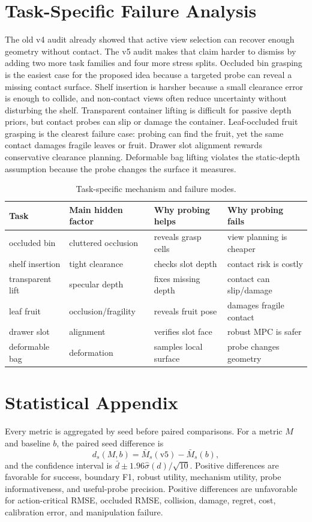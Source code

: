 \documentclass{article}
\begin{document}
\section{Task-Specific Failure Analysis}
The old v4 audit already showed that active view selection can recover enough geometry without contact. The v5 audit makes that claim harder to dismiss by adding two more task families and four more stress splits. Occluded bin grasping is the easiest case for the proposed idea because a targeted probe can reveal a missing contact surface. Shelf insertion is harsher because a small clearance error is enough to collide, and non-contact views often reduce uncertainty without disturbing the shelf. Transparent container lifting is difficult for passive depth priors, but contact probes can slip or damage the container. Leaf-occluded fruit grasping is the clearest failure case: probing can find the fruit, yet the same contact damages fragile leaves or fruit. Drawer slot alignment rewards conservative clearance planning. Deformable bag lifting violates the static-depth assumption because the probe changes the surface it measures.

\begin{table}[t]
\centering
\small
\begin{tabular}{llll}
\toprule
Task & Main hidden factor & Why probing helps & Why probing fails \\
\midrule
occluded bin & cluttered occlusion & reveals grasp cells & view planning is cheaper \\
shelf insertion & tight clearance & checks slot depth & contact risk is costly \\
transparent lift & specular depth & fixes missing depth & contact can slip/damage \\
leaf fruit & occlusion/fragility & reveals fruit pose & damages fragile contact \\
drawer slot & alignment & verifies slot face & robust MPC is safer \\
deformable bag & deformation & samples local surface & probe changes geometry \\
\bottomrule
\end{tabular}
\caption{Task-specific mechanism and failure modes.}
\label{tab:taskfailure}
\end{table}

\section{Statistical Appendix}
Every metric is aggregated by seed before paired comparisons. For a metric $M$ and baseline $b$, the paired seed difference is
\[
  d_s(M,b)=\bar{M}_s(\text{v5})-\bar{M}_s(b),
\]
and the confidence interval is $\bar{d}\pm 1.96\widehat{\sigma}(d)/\sqrt{10}$. Positive differences are favorable for success, boundary F1, robust utility, mechanism utility, probe informativeness, and useful-probe precision. Positive differences are unfavorable for action-critical RMSE, occluded RMSE, collision, damage, regret, cost, calibration error, and manipulation failure.
\end{document}
